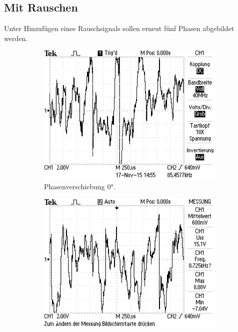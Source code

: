  \subsection {Mit Rauschen}
 Unter Hinzufügen eines Rauschsignals sollen erneut fünf Phasen abgebildet werden.
\begin{figure}
 \begin{subfigure}{0.48\textwidth}
   \centering
   \includegraphics[width=\textwidth]{bilder/Mit Rauschen/1.JPG}
 \caption{Phasenverschiebung 0°.}
   \label{fig:1}
 \end{subfigure}
 \begin{subfigure}{0.48\textwidth}
   \centering
   \includegraphics[width=\textwidth]{bilder/Mit Rauschen/2.JPG}

\end{subfigure}
\end{figure}
